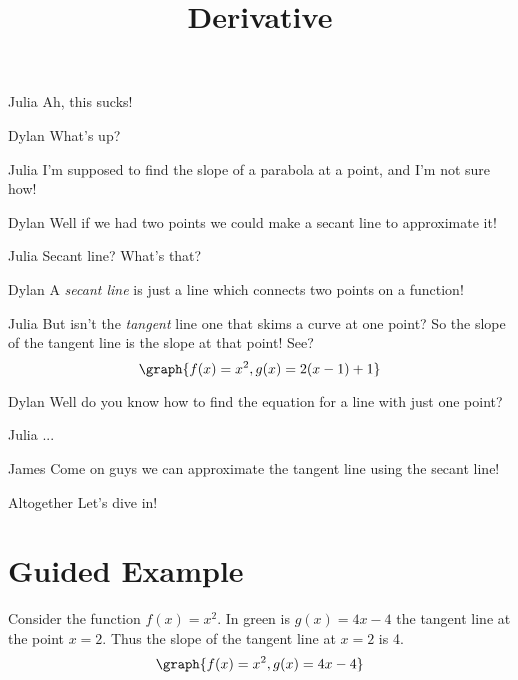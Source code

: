 \documentclass{ximera}
\title{Derivative}
\begin{document}
\maketitle
\begin{dialogue}
\item[Julia] Ah, this sucks!
\item[Dylan] What's up?
\item[Julia] I'm supposed to find the slope of a parabola at a point, and I'm not sure how!
\item[Dylan] Well if we had two points we could make a secant line to approximate it!
\item[Julia] Secant line? What's that?
\item[Dylan] A \textit{secant line} is just a line which connects two points on a function!
\item[Julia] But isn't the \textit{tangent} line one that skims a curve at one point? So the slope of the tangent line is the slope at that point! See?
\[
\graph{f(x)=x^2,g(x)=2(x-1)+1}
\]
\item[Dylan] Well do you know how to find the equation for a line with just one point?
\item[Julia]...
\item[James] Come on guys we can approximate the tangent line using the secant line!
\item[Altogether]Let's dive in!
\end{dialogue}



\section{Guided Example}

Consider the function $f(x) = x^2$. In green is $g(x)=4x-4$ the tangent line at the point $x=2$. Thus the slope of the tangent line at $x=2$ is 4.
\[
\graph{f(x)=x^2,g(x)=4x-4}
\]
\end{document}
